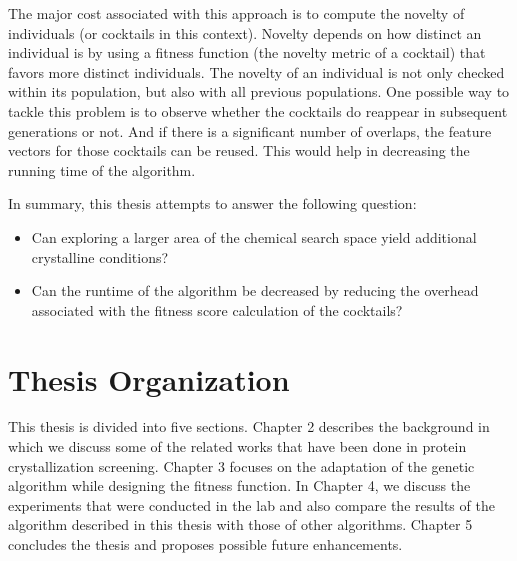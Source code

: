 The major cost associated with this approach is to compute the novelty of individuals (or cocktails in this context). Novelty depends on how distinct an individual is by using a fitness function (the novelty metric of a cocktail) that favors more distinct individuals. The novelty of an individual is not only checked within its population, but also with all previous populations. 
One possible way to tackle this problem is to observe whether the cocktails do reappear in subsequent generations or not. And if there is a significant number of overlaps, the feature vectors for those cocktails can be reused. This would help in decreasing the running time of the algorithm.

In summary, this thesis attempts to answer the following question:
\begin{itemize}
\item Can exploring a larger area of the chemical search space yield additional crystalline conditions?
\item Can the runtime of the algorithm be decreased by reducing the overhead associated with the fitness score calculation of the cocktails?
\end{itemize}

\section{Thesis Organization} \label{intro:organization}

This thesis is divided into five sections. %
Chapter 2 describes the background in which we discuss some of the related works that have been done in protein crystallization screening. Chapter 3 focuses on the adaptation of the genetic algorithm while designing the fitness function. In Chapter 4, we discuss the experiments that were conducted in the lab and also compare the results of the algorithm described in this thesis with those of other algorithms. Chapter 5 concludes the thesis and proposes possible future enhancements.







